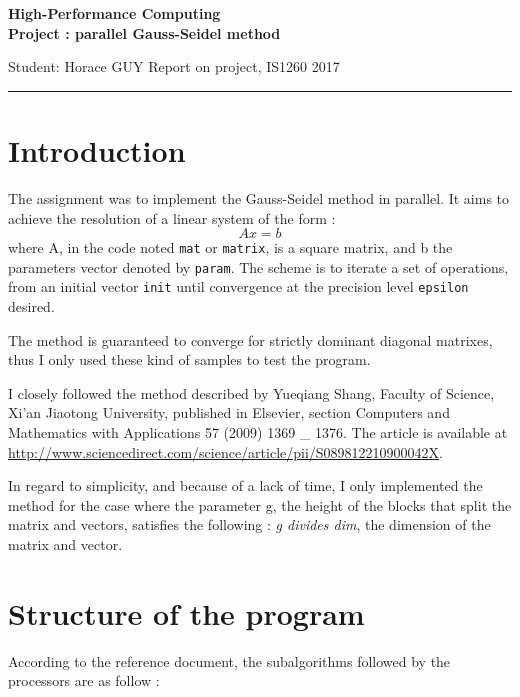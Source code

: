 \documentclass[a4paper,12pt]{article}
\begin{document}

\begin{center}
\bf\large High-Performance Computing \\
Project : parallel Gauss-Seidel method
\end{center}

\noindent
Student: Horace GUY
\hfill
Report on project, IS1260 2017

\noindent
\rule{\textwidth}{1pt}

\medskip

\section{Introduction}

The assignment was to implement the Gauss-Seidel method in parallel. It aims to achieve the resolution of a linear system of the form :
\[ Ax = b \]
where A, in the code noted {\tt mat} or {\tt matrix}, is a square matrix, and b the parameters vector denoted by {\tt param}.
The scheme is to iterate a set of operations, from an initial vector {\tt init} until convergence at the precision level {\tt epsilon }desired.

The method is guaranteed to converge for strictly dominant diagonal matrixes, thus I only used these kind of samples to test the program.

I closely followed the method described by Yueqiang Shang, Faculty of Science, Xi'an Jiaotong University, published in Elsevier, section Computers and Mathematics with Applications 57 (2009) 1369 \_ 1376. The article is available at \url{http://www.sciencedirect.com/science/article/pii/S089812210900042X}.

In regard to simplicity, and because of a lack of time, I only implemented the method for the case where the parameter g, the height of the blocks that split the matrix and vectors, satisfies the following : \emph{g divides dim}, the dimension of the matrix and vector. 

\section{Structure of the program}
According to the reference document, the subalgorithms followed by the processors are as follow :
\end{document}
